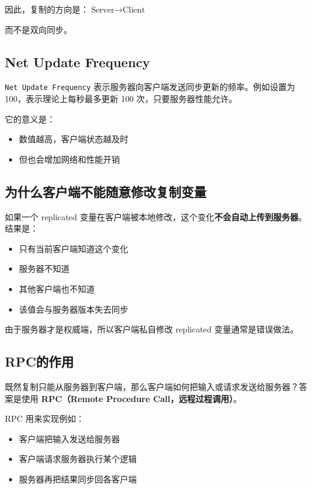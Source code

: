因此，复制的方向是：$\text{Server} \rightarrow \text{Client}$


而不是双向同步。

\subsection{Net Update Frequency}

\texttt{Net Update Frequency} 表示服务器向客户端发送同步更新的频率。例如设置为 100，表示理论上每秒最多更新 100 次，只要服务器性能允许。

它的意义是：

\begin{itemize}
	\item 数值越高，客户端状态越及时
	\item 但也会增加网络和性能开销
\end{itemize}

\subsection{为什么客户端不能随意修改复制变量}

如果一个 replicated 变量在客户端被本地修改，这个变化\textbf{不会自动上传到服务器}。结果是：

\begin{itemize}
	\item 只有当前客户端知道这个变化
	\item 服务器不知道
	\item 其他客户端也不知道
	\item 该值会与服务器版本失去同步
\end{itemize}

由于服务器才是权威端，所以客户端私自修改 replicated 变量通常是错误做法。

\subsection{RPC的作用}

既然复制只能从服务器到客户端，那么客户端如何把输入或请求发送给服务器？答案是使用 \textbf{RPC（Remote Procedure Call，远程过程调用）}。

RPC 用来实现例如：

\begin{itemize}
	\item 客户端把输入发送给服务器
	\item 客户端请求服务器执行某个逻辑
	\item 服务器再把结果同步回各客户端
\end{itemize}


